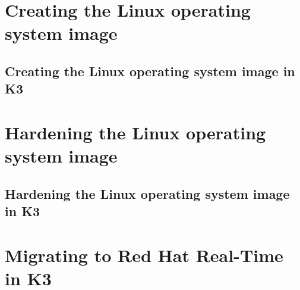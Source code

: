 \documentclass[12pt]{article}
\begin{document}
%
\section{Creating the Linux operating system image}
\label{sec:image_creation}

\subsection{Creating the Linux operating system image in K3}


%
\section{Hardening the Linux operating system image}
\label{sec:image_hardening}

\subsection{Hardening the Linux operating system image in K3}


%
\section{Migrating to Red Hat Real-Time in K3}
\label{sec:redhat_migration}


\begin{table}[H]
\captionsetup{width=.9\linewidth}
\caption{License costs}
\label{tab:license_costs}
\end{table}
\end{document}
